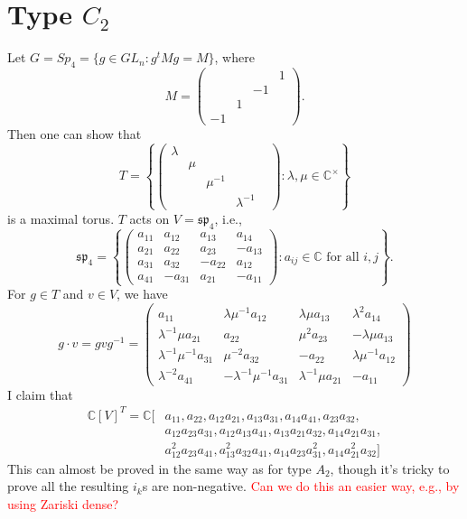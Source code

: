 \documentclass[12pt]{amsart}
\newcommand{\C}{\mathbb{C}}
\theoremstyle{remark}
\theoremstyle{remark}
\begin{document}
\section*{Type $C_2$}
Let $G = Sp_4 = \{
g \in GL_n : g^t M g = M
\}
$,
where
$$M = \begin{pmatrix} & & & 1 \\ & & -1 & \\ & 1 & & \\ -1 & & & \end{pmatrix}.$$
Then one can show that
$$T = \left\{
\begin{pmatrix} \lambda & & & \\ & \mu & & & \\ & & \mu^{-1} & \\ & & & \lambda^{-1} \end{pmatrix} :
\lambda, \mu \in \C^\times 
\right\}$$
is a maximal torus.
$T$ acts on $V = \mathfrak{sp}_4$, i.e.,
$$\mathfrak{sp}_4
= \left\{
\begin{pmatrix}
a_{11} & a_{12} & a_{13} & a_{14} \\
a_{21} & a_{22} & a_{23} & - a_{13} \\
a_{31} & a_{32} & - a_{22} & a_{12} \\
a_{41} & - a_{31} & a_{21} & - a_{11}
\end{pmatrix} : 
a_{ij} \in \mathbb{C} \text{ for all } i, j
\right\}.$$
For $g \in T$ and $v \in V$, we have
$$g \cdot v = g v g^{-1} 
= 
\begin{pmatrix}
a_{11} & \lambda \mu^{-1} a_{12} & \lambda \mu a_{13} & \lambda^2 a_{14} \\
\lambda^{-1} \mu a_{21} & a_{22} & \mu^2 a_{23} & - \lambda \mu a_{13} \\
\lambda^{-1} \mu^{-1} a_{31} & \mu^{-2} a_{32} & - a_{22} & \lambda \mu^{-1} a_{12} \\
\lambda^{-2} a_{41} & - \lambda^{-1} \mu^{-1} a_{31} & \lambda^{-1} \mu a_{21} & - a_{11}
\end{pmatrix}
$$
I claim that
\begin{align*}
\C[V]^T
= 
\C[&a_{11}, a_{22}, a_{12} a_{21}, a_{13} a_{31}, a_{14} a_{41}, a_{23} a_{32}, \\
	&a_{12} a_{23} a_{31}, a_{12} a_{13} a_{41}, a_{13} a_{21} a_{32}, a_{14} a_{21} a_{31}, \\
	&a_{12}^2 a_{23} a_{41}, a_{13}^2 a_{32} a_{41}, a_{14} a_{23} a_{31}^2, a_{14} a_{21}^2 a_{32}]
\end{align*}
This can almost be proved in the same way as for type $A_2$, though it's tricky to prove all the resulting $i_k$s are non-negative.
\textcolor{red}{Can we do this an easier way, e.g., by using Zariski dense?}
\end{document}
